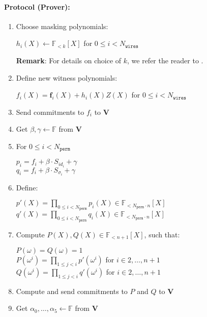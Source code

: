 \paragraph{Protocol (Prover):}
\begin{enumerate}
	\item Choose masking polynomials: 
	\begin{center}
		$h_i(X) \leftarrow \mathbb{F}_{<k}[X]$ for $0 \leq i < N_{\texttt{wires}}$
	\end{center}
	\textbf{Remark}: For details on choice of $k$, we refer the reader to \cite{cryptoeprint:2019:1400}.
	\item Define new witness polynomials:
	\begin{center}
		$f_i(X) = \textbf{f}_{i}(X) + h_i(X)Z(X)$ for $0 \leq i < N_{\texttt{wires}}$
	\end{center}
	\item Send commitments to $f_i$ to $\textbf{V}$
	\item Get $\beta, \gamma \leftarrow \mathbb{F}$ from \textbf{V}
	\item For $0 \leq i < N_{\texttt{perm}}$
	\begin{center}
		$p_i = f_i + \beta \cdot S_{id_i} + \gamma$ \\
		$q_i = f_i + \beta \cdot S_{\sigma_i} + \gamma$
	\end{center}
	\item Define:
	\begin{center}
		$p'(X) = \prod\limits_{0 \leq i < N_{\texttt{perm}}} p_i(X) \in \mathbb{F}_{<N_{\texttt{perm}} \cdot n}[X]$ \\
		$q'(X) = \prod\limits_{0 \leq i < N_{\texttt{perm}}} q_i(X) \in \mathbb{F}_{<N_{\texttt{perm}} \cdot n}[X]$
	\end{center}
	\item Compute $P(X), Q(X) \in \mathbb{F}_{<n+1}[X]$, such that:
	\begin{center}
		$P(\omega) = Q(\omega) = 1$ \\
		$P(\omega^i) = \prod\limits_{1 \leq j < i}p'(\omega^i)$ for $i \in {2, \dots, n + 1}$ \\
		$Q(\omega^i) = \prod\limits_{1 \leq j < i}q'(\omega^i)$ for $i \in {2, \dots, n + 1}$ \\
	\end{center}
	\item Compute and send commitments to $P$ and $Q$ to \textbf{V}
	\item Get $\alpha_0, \dots, \alpha_5 \leftarrow \mathbb{F}$ from \textbf{V}

\end{enumerate}
